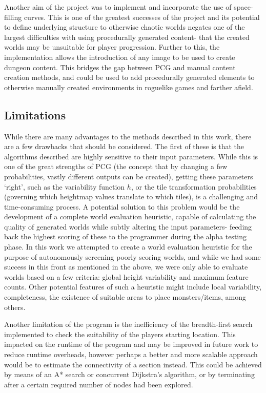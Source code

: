 \documentclass[12pt,a4paper]{article}
\begin{document}
Another aim of the project was to implement and incorporate the use of space-filling curves. This is one of the greatest successes of the project and its potential to define underlying structure to otherwise chaotic worlds negates one of the largest difficulties with using procedurally generated content- that the created worlds may be unsuitable for player progression. Further to this, the implementation allows the introduction of any image to be used to create dungeon content. This bridges the gap between PCG and manual content creation methods, and could be used to add procedurally generated elements to otherwise manually created environments in roguelike games and farther afield. 


\subsection{Limitations}

While there are many advantages to the methods described in this work, there are a few drawbacks that should be considered. The first of these is that the algorithms described are highly sensitive to their input parameters. While this is one of the great strengths of PCG (the concept that by changing a few probabilities, vastly different outputs can be created), getting these parameters `right', such as the variability function $h$, or the tile transformation probabilities (governing which heightmap values translate to which tiles), is a challenging and time-consuming process. A potential solution to this problem would be the development of a complete world evaluation heuristic, capable of calculating the quality of generated worlds while subtly altering the input parameters- feeding back the highest scoring of these to the programmer during the alpha testing phase. In this work we attempted to create a world evaluation heuristic for the purpose of autonomously screening poorly scoring worlds, and while we had some success in this front as mentioned in the above, we were only able to evaluate worlds based on a few criteria: global height variability and maximum feature counts. Other potential features of such a heuristic might include local variability, completeness, the existence of suitable areas to place monsters/items, among others. 

Another limitation of the program is the inefficiency of the breadth-first search implemented to check the suitability of the players starting location. This impacted on the runtime of the program and may be improved in future work to reduce runtime overheads, however perhaps a better and more scalable approach would be to estimate the connectivity of a section instead. This could be achieved by means of an A* search or concurrent Dijkstra's algorithm, or by terminating after a certain required number of nodes had been explored. 
\end{document}
